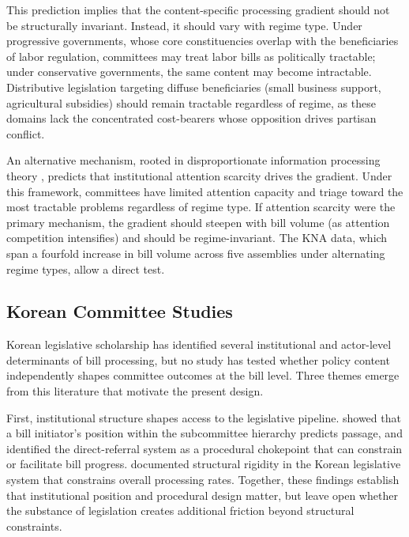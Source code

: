 \documentclass[11pt]{article}
\begin{document}
This prediction implies that the content-specific processing gradient should not be structurally invariant. Instead, it should vary with regime type. Under progressive governments, whose core constituencies overlap with the beneficiaries of labor regulation, committees may treat labor bills as politically tractable; under conservative governments, the same content may become intractable. Distributive legislation targeting diffuse beneficiaries (small business support, agricultural subsidies) should remain tractable regardless of regime, as these domains lack the concentrated cost-bearers whose opposition drives partisan conflict.

An alternative mechanism, rooted in disproportionate information processing theory \citep{jones2004,jones2005}, predicts that institutional attention scarcity drives the gradient. Under this framework, committees have limited attention capacity and triage toward the most tractable problems regardless of regime type. If attention scarcity were the primary mechanism, the gradient should steepen with bill volume (as attention competition intensifies) and should be regime-invariant. The KNA data, which span a fourfold increase in bill volume across five assemblies under alternating regime types, allow a direct test.

\subsection{Korean Committee Studies}

Korean legislative scholarship has identified several institutional and actor-level determinants of bill processing, but no study has tested whether policy content independently shapes committee outcomes at the bill level. Three themes emerge from this literature that motivate the present design.

First, institutional structure shapes access to the legislative pipeline. \citet{kim2023} showed that a bill initiator's position within the subcommittee hierarchy predicts passage, and \citet{park2026} identified the direct-referral system as a procedural chokepoint that can constrain or facilitate bill progress. \citet{kim2026} documented structural rigidity in the Korean legislative system that constrains overall processing rates. Together, these findings establish that institutional position and procedural design matter, but leave open whether the substance of legislation creates additional friction beyond structural constraints.
\end{document}
